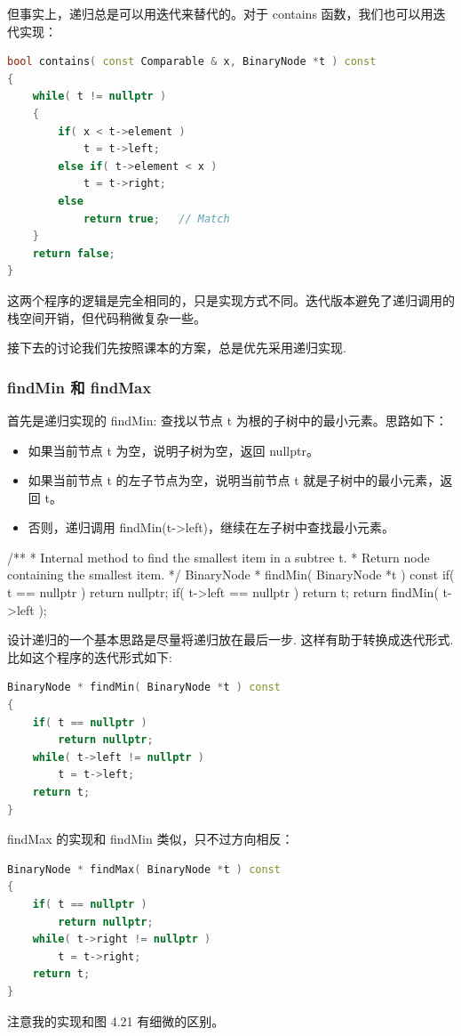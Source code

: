 \documentclass[a4paper]{ctexart}
\theoremstyle{definition}
\theoremstyle{definition}
\begin{document}
但事实上，递归总是可以用迭代来替代的。对于 contains 函数，我们也可以用迭代实现：

\begin{lstlisting}[language=C++]
bool contains( const Comparable & x, BinaryNode *t ) const
{
    while( t != nullptr )
    {
        if( x < t->element )
            t = t->left;
        else if( t->element < x )
            t = t->right;
        else
            return true;   // Match
    }
    return false;
}
\end{lstlisting}

这两个程序的逻辑是完全相同的，只是实现方式不同。迭代版本避免了递归调用的栈空间开销，但代码稍微复杂一些。

接下去的讨论我们先按照课本的方案，总是优先采用递归实现.

\subsubsection*{findMin 和 findMax}

首先是递归实现的 findMin: 查找以节点 t 为根的子树中的最小元素。思路如下：

\begin{itemize}
  \item 如果当前节点 t 为空，说明子树为空，返回 nullptr。
  \item 如果当前节点 t 的左子节点为空，说明当前节点 t 就是子树中的最小元素，返回 t。
  \item 否则，递归调用 findMin(t->left)，继续在左子树中查找最小元素。
\end{itemize}

/**
 * Internal method to find the smallest item in a subtree t.
 * Return node containing the smallest item.
 */
BinaryNode * findMin( BinaryNode *t ) const
{
    if( t == nullptr )
        return nullptr;
    if( t->left == nullptr )
        return t;
    return findMin( t->left );
}

设计递归的一个基本思路是尽量将递归放在最后一步. 这样有助于转换成迭代形式.
比如这个程序的迭代形式如下:

\begin{lstlisting}[language=C++]
BinaryNode * findMin( BinaryNode *t ) const
{
    if( t == nullptr )
        return nullptr;
    while( t->left != nullptr )
        t = t->left;  
    return t;
}
\end{lstlisting}

findMax 的实现和 findMin 类似，只不过方向相反：
\begin{lstlisting}[language=C++]
BinaryNode * findMax( BinaryNode *t ) const
{
    if( t == nullptr )
        return nullptr;
    while( t->right != nullptr )
        t = t->right;  
    return t;
}
\end{lstlisting}
注意我的实现和图 4.21 有细微的区别。
\end{document}
